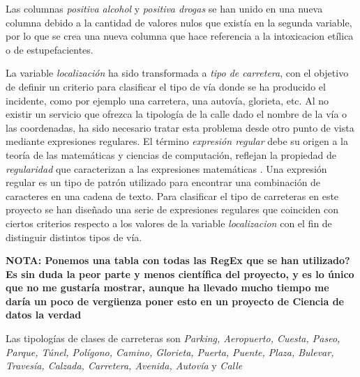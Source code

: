 \begin{enumerate}
                    Las columnas \textit{positiva alcohol} y \textit{positiva drogas} se han unido en una nueva columna debido a la cantidad de valores nulos que existía en la segunda variable, por lo que se crea una nueva columna que hace referencia a la intoxicacion etílica o de estupefacientes.
  

                    La variable \textit{localización} ha sido transformada a \textit{tipo de carretera}, con el objetivo de definir un criterio para clasificar el tipo de vía donde se ha producido el incidente, como por ejemplo una carretera, una autovía, glorieta, etc. Al no existir un servicio que ofrezca la tipología de la calle dado el nombre de la vía o las coordenadas, ha sido necesario tratar esta problema desde otro punto de vista mediante expresiones regulares. El término \textit{expresión regular} debe su origen a la teoría de las matemáticas y ciencias de computación, reflejan la propiedad de \textit{regularidad} que caracterizan a las expresiones matemáticas \cite{RegeXBook}. Una expresión regular es un tipo de patrón utilizado para encontrar una combinación de caracteres en una cadena de texto. Para clasificar el tipo de carreteras en este proyecto se han diseñado una serie de expresiones regulares que coinciden con ciertos criterios respecto a los valores de la variable \textit{localizacion} con el fin de distinguir distintos tipos de vía.


                    \textbf{NOTA: Ponemos una tabla con todas las RegEx que se han utilizado? Es sin duda la peor parte y menos científica del proyecto, y es lo único que no me gustaría mostrar, aunque ha llevado mucho tiempo me daría un poco de vergüenza poner esto en un proyecto de Ciencia de datos la verdad}


                    Las tipologías de clases de carreteras son \textit{Parking, Aeropuerto, Cuesta, Paseo, Parque, Túnel, Polígono, Camino, Glorieta, Puerta, Puente, Plaza, Bulevar, Travesía, Calzada, Carretera, Avenida, Autovía} y \textit{Calle}



\end{enumerate}
